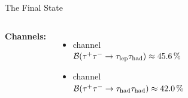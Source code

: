 \documentclass[11pt, xcolor={dvipsnames}, aspectratio=169, notes]{beamer}
\begin{document}
\begin{frame}{The \allbold{\bbtautau} Final State}

  \begin{columns}[onlytextwidth]



    \textbf{Channels:}
    \begin{itemize}
      \setlength{\itemsep}{0.5em}
    \item<1-> \lephad channel\\
      $\mathcal{B}(\tau^+\tau^- \to \tau_{\text{lep}}\tau_{\text{had}}) \approx \SI{45.6}{\percent}$

    \item<2-> \hadhad channel\\
      $\mathcal{B}(\tau^+\tau^- \to \tau_{\text{had}}\tau_{\text{had}}) \approx \SI{42.0}{\percent}$
    \end{itemize}

     \centering


\end{columns}
\end{frame}
\end{document}
